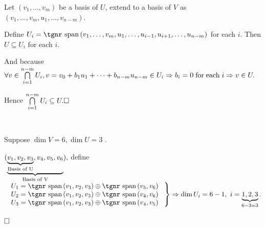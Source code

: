 \documentclass[a4paper, 11pt, UTF8]{article}
\def\Spn{{\textup{\tgnr span}}\,}
\def\BulletPoint{{\small\bullet}}
\begin{document}
\begin{large}

\par\quad
Let $(v_1,\dots,v_m)$ be a basis of $U$, extend to a basis of $V$ as $(v_1,\dots,v_m,u_1,\dots,v_{n-m})$.\par\quad
Define $U_i=\Spn(v_1,\dots,v_m,u_1,\dots,u_{i-1},u_{i+1},\dots,u_{n-m})$ for each $i$. Then $U\subseteq U_i$ for each $i.$\vspace{4pt}\par\quad
\vspace{2pt}And because $\forall v\in \bigcap\limits_{i=1}^{n-m}U_i,v=v_0+b_1 u_1+\dots+b_{n-m} u_{n-m}\in U_i\Rightarrow b_i=0 \textup{\;for\;each\;} i\Rightarrow v\in U.$\par\quad
\vspace{8pt}Hence $\bigcap\limits_{i=1}^{n-m}U_i\subseteq U.\hfill\square$\par
\Example\,\,\, {\normalsize Suppose $\dim V=6,\dim U=3$ .\par\quad
$(\underbrace{\underbrace{v_1,v_2,v_3}_{\textup{Basis of U}},v_4,v_5,v_6}_{\textup{Basis of V}}),$ define $\MathRightBrace{l}{$
$U_1=\Spn(v_1,v_2,v_3)\oplus\Spn(v_5,v_6)\\ $
$U_2=\Spn(v_1,v_2,v_3)\oplus\Spn(v_4,v_6)\\ $
$U_3=\Spn(v_1,v_2,v_3)\oplus\Spn(v_4,v_5)$
$}\Rightarrow\dim U_i=6-1,\,\,i=\underbrace{1,2,3}_{6-3=3}.$}
$\hfill\square$\vspace{10pt}
\SepLine\par


\end{large}
\end{document}

